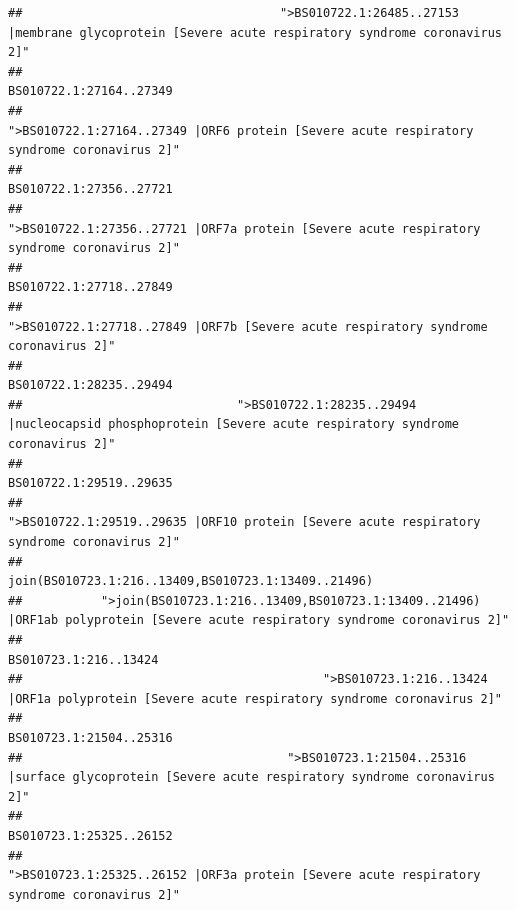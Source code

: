\documentclass[
]{article}
\begin{document}
\begin{verbatim}
##                                    ">BS010722.1:26485..27153 |membrane glycoprotein [Severe acute respiratory syndrome coronavirus 2]" 
##                                                                                                                BS010722.1:27164..27349 
##                                             ">BS010722.1:27164..27349 |ORF6 protein [Severe acute respiratory syndrome coronavirus 2]" 
##                                                                                                                BS010722.1:27356..27721 
##                                            ">BS010722.1:27356..27721 |ORF7a protein [Severe acute respiratory syndrome coronavirus 2]" 
##                                                                                                                BS010722.1:27718..27849 
##                                                    ">BS010722.1:27718..27849 |ORF7b [Severe acute respiratory syndrome coronavirus 2]" 
##                                                                                                                BS010722.1:28235..29494 
##                              ">BS010722.1:28235..29494 |nucleocapsid phosphoprotein [Severe acute respiratory syndrome coronavirus 2]" 
##                                                                                                                BS010722.1:29519..29635 
##                                            ">BS010722.1:29519..29635 |ORF10 protein [Severe acute respiratory syndrome coronavirus 2]" 
##                                                                                    join(BS010723.1:216..13409,BS010723.1:13409..21496) 
##           ">join(BS010723.1:216..13409,BS010723.1:13409..21496) |ORF1ab polyprotein [Severe acute respiratory syndrome coronavirus 2]" 
##                                                                                                                  BS010723.1:216..13424 
##                                          ">BS010723.1:216..13424 |ORF1a polyprotein [Severe acute respiratory syndrome coronavirus 2]" 
##                                                                                                                BS010723.1:21504..25316 
##                                     ">BS010723.1:21504..25316 |surface glycoprotein [Severe acute respiratory syndrome coronavirus 2]" 
##                                                                                                                BS010723.1:25325..26152 
##                                            ">BS010723.1:25325..26152 |ORF3a protein [Severe acute respiratory syndrome coronavirus 2]" 

\end{verbatim}
\end{document}
